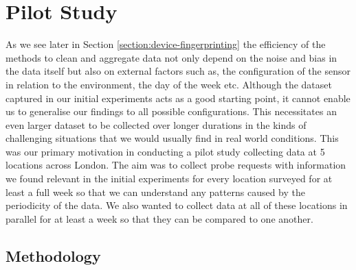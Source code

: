 \section{Pilot Study}

As we see later in Section \ref{section:device-fingerprinting} the efficiency of the methods to clean and aggregate data not only depend on the noise and bias in the data itself but also on external factors such as, the configuration of the sensor in relation to the environment, the day of the week etc.
Although the dataset captured in our initial experiments acts as a good starting point, it cannot enable us to generalise our findings to all possible configurations.
This necessitates an even larger dataset to be collected over longer durations in the kinds of challenging situations that we would usually find in real world conditions.
This was our primary motivation in conducting a pilot study collecting data at 5 locations across London.
The aim was to collect probe requests with information we found relevant in the initial experiments for every location surveyed for at least a full week so that we can understand any patterns caused by the periodicity of the data.
We also wanted to collect data at all of these locations in parallel for at least a week so that they can be compared to one another. 

\subsection{Methodology}

